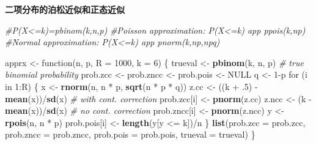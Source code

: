 \documentclass[]{article}
\newenvironment{Shaded}{\begin{snugshade}}{\end{snugshade}}
\newcommand{\KeywordTok}[1]{\textcolor[rgb]{0.13,0.29,0.53}{\textbf{{#1}}}}
\newcommand{\DataTypeTok}[1]{\textcolor[rgb]{0.13,0.29,0.53}{{#1}}}
\newcommand{\DecValTok}[1]{\textcolor[rgb]{0.00,0.00,0.81}{{#1}}}
\newcommand{\StringTok}[1]{\textcolor[rgb]{0.31,0.60,0.02}{{#1}}}
\newcommand{\CommentTok}[1]{\textcolor[rgb]{0.56,0.35,0.01}{\textit{{#1}}}}
\newcommand{\OtherTok}[1]{\textcolor[rgb]{0.56,0.35,0.01}{{#1}}}
\newcommand{\NormalTok}[1]{{#1}}
\begin{document}
\textbf{二项分布的泊松近似和正态近似}

\begin{Shaded}
\begin{Highlighting}[]
\CommentTok{#P(X<=k)=pbinom(k,n,p)}
\CommentTok{#Poisson approximation: P(X<=k) app ppois(k,np)}
\CommentTok{#Normal approximation: P(X<=k) app pnorm(k,np,npq)}

\NormalTok{apprx <-}\StringTok{ }\NormalTok{function(n, p, }\DataTypeTok{R =} \DecValTok{1000}\NormalTok{, }\DataTypeTok{k =} \DecValTok{6}\NormalTok{) \{}
  \NormalTok{trueval <-}\StringTok{ }\KeywordTok{pbinom}\NormalTok{(k, n, p) }\CommentTok{# true binomial probability}
  \NormalTok{prob.zcc <-}\StringTok{ }\NormalTok{prob.zncc <-}\StringTok{ }\NormalTok{prob.pois <-}\StringTok{ }\OtherTok{NULL}  
  \NormalTok{q <-}\StringTok{ }\DecValTok{1}\NormalTok{-p}
  \NormalTok{for (i in }\DecValTok{1}\NormalTok{:R) \{}
    \NormalTok{x <-}\StringTok{ }\KeywordTok{rnorm}\NormalTok{(n, n *}\StringTok{ }\NormalTok{p, }\KeywordTok{sqrt}\NormalTok{(n *}\StringTok{ }\NormalTok{p *}\StringTok{ }\NormalTok{q))}
    \NormalTok{z.cc <-}\StringTok{ }\NormalTok{((k +}\StringTok{ }\NormalTok{.}\DecValTok{5}\NormalTok{) -}\StringTok{ }\KeywordTok{mean}\NormalTok{(x))/}\KeywordTok{sd}\NormalTok{(x) }\CommentTok{# with cont. correction}
    \NormalTok{prob.zcc[i] <-}\StringTok{ }\KeywordTok{pnorm}\NormalTok{(z.cc)}
    \NormalTok{z.ncc <-}\StringTok{ }\NormalTok{(k -}\StringTok{ }\KeywordTok{mean}\NormalTok{(x))/}\KeywordTok{sd}\NormalTok{(x) }\CommentTok{# no cont. correction}
    \NormalTok{prob.zncc[i] <-}\StringTok{ }\KeywordTok{pnorm}\NormalTok{(z.ncc)    }
    \NormalTok{y <-}\StringTok{ }\KeywordTok{rpois}\NormalTok{(n, n *}\StringTok{ }\NormalTok{p)}
    \NormalTok{prob.pois[i] <-}\StringTok{ }\KeywordTok{length}\NormalTok{(y[y <=}\StringTok{ }\NormalTok{k])/n}
  \NormalTok{\}}
  \KeywordTok{list}\NormalTok{(}\DataTypeTok{prob.zcc =} \NormalTok{prob.zcc, }\DataTypeTok{prob.zncc =} \NormalTok{prob.zncc, }
       \DataTypeTok{prob.pois =} \NormalTok{prob.pois, }\DataTypeTok{trueval =} \NormalTok{trueval)}
\NormalTok{\}}


\end{Highlighting}
\end{Shaded}
\end{document}
